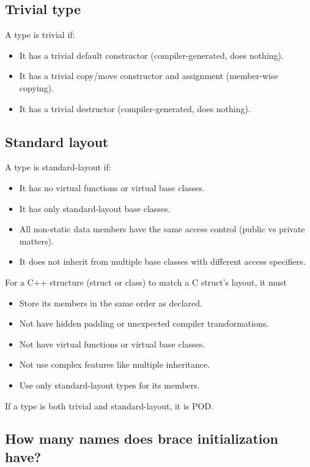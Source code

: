 \documentclass{report}
\begin{document}
    \subsection{Trivial type}
    \bigbreak \noindent 
    A type is trivial if:
    \begin{itemize}
        \item It has a trivial default constructor (compiler-generated, does nothing).
        \item It has a trivial copy/move constructor and assignment (member-wise copying).
        \item It has a trivial destructor (compiler-generated, does nothing).
    \end{itemize}
    \bigbreak \noindent 
    \subsection{Standard layout}
    \bigbreak \noindent 
    A type is standard-layout if:
    \begin{itemize}
        \item It has no virtual functions or virtual base classes.
        \item It has only standard-layout base classes.
        \item All non-static data members have the same access control (public vs private matters).
        \item It does not inherit from multiple base classes with different access specifiers.
    \end{itemize}
    \bigbreak \noindent 
    For a C++ structure (struct or class) to match a C struct's layout, it must
    \begin{itemize}
        \item Store its members in the same order as declared.
        \item Not have hidden padding or unexpected compiler transformations.
        \item Not have virtual functions or virtual base classes.
        \item Not use complex features like multiple inheritance.
        \item Use only standard-layout types for its members.
    \end{itemize}
    \bigbreak \noindent 
    If a type is both trivial and standard-layout, it is POD.

    \pagebreak 
    \bigbreak \noindent 
    \subsection{How many names does brace initialization have?}
    \bigbreak \noindent 
\end{document}
